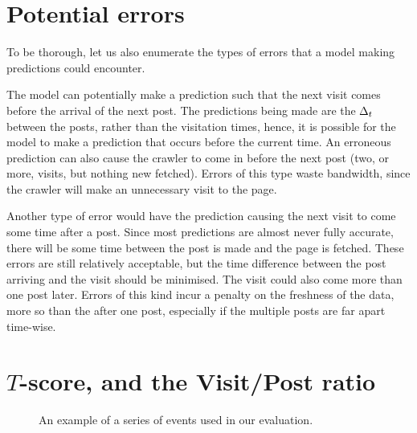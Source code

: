 
\section{Potential errors}
To be thorough, let us also enumerate the types of errors that a model making 
predictions could encounter.

The model can potentially make a prediction such that the next visit comes 
before the arrival of the next post. The predictions being made are the $\Delta_t$ 
between the posts, rather than the visitation times, hence, it is possible for 
the model to make a prediction that occurs before the current time. An erroneous 
prediction can also cause the crawler to come in before the next post (two, or 
more, visits, but nothing new fetched). Errors of this type waste bandwidth, 
since the crawler will make an unnecessary visit to the page.

Another type of error would have the prediction causing the next visit to come 
some time after a post. Since most predictions are almost never fully accurate, 
there will be some time between the post is made and the page is fetched. These 
errors are still relatively acceptable, but the time difference between the post 
arriving and the visit should be minimised. The visit could also come more than 
one post later. Errors of this kind incur a penalty on the freshness of the 
data, more so than the after one post, especially if the multiple posts are far 
apart time-wise.

\section{$T$-score, and the Visit/Post ratio}

\begin{figure}
	\begin{center}
	
	\caption{An example of a series of events used in our evaluation.}
	\end{center}
\end{figure}

